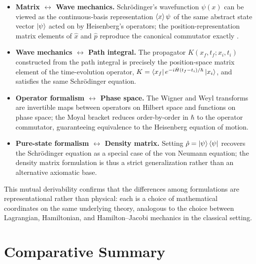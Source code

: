 \documentclass[11pt,a4paper]{article}
\begin{document}
\begin{itemize}
    \item \textbf{Matrix $\leftrightarrow$ Wave mechanics.} Schr\"odinger's wavefunction $\psi(x)$ can be viewed as the continuous-basis representation $\braket{x}{\psi}$ of the same abstract state vector $\ket{\psi}$ acted on by Heisenberg's operators; the position-representation matrix elements of $\hat{x}$ and $\hat{p}$ reproduce the canonical commutator exactly \citep{schrodinger1926b}.
    \item \textbf{Wave mechanics $\leftrightarrow$ Path integral.} The propagator $K(x_f,t_f;x_i,t_i)$ constructed from the path integral is precisely the position-space matrix element of the time-evolution operator, $K = \bra{x_f} e^{-i\hat{H}(t_f-t_i)/\hbar}\ket{x_i}$, and satisfies the same Schr\"odinger equation.
    \item \textbf{Operator formalism $\leftrightarrow$ Phase space.} The Wigner and Weyl transforms are invertible maps between operators on Hilbert space and functions on phase space; the Moyal bracket reduces order-by-order in $\hbar$ to the operator commutator, guaranteeing equivalence to the Heisenberg equation of motion.
    \item \textbf{Pure-state formalism $\leftrightarrow$ Density matrix.} Setting $\hat\rho = \ket{\psi}\bra{\psi}$ recovers the Schr\"odinger equation as a special case of the von Neumann equation; the density matrix formulation is thus a strict generalization rather than an alternative axiomatic base.
\end{itemize}

This mutual derivability confirms that the differences among formulations are representational rather than physical: each is a choice of mathematical coordinates on the same underlying theory, analogous to the choice between Lagrangian, Hamiltonian, and Hamilton--Jacobi mechanics in the classical setting.

\section{Comparative Summary}
\end{document}
